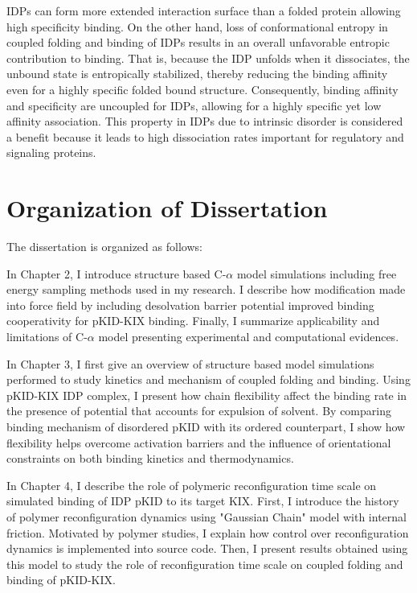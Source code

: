 \documentclass[../talant.diss.submit.tex]{subfiles}
\begin{document}
IDPs can form more extended interaction surface than a folded protein allowing
high specificity binding. On the other hand, loss of conformational entropy in
coupled folding and binding of IDPs results in an overall unfavorable entropic
contribution to binding.
That is, because the IDP unfolds when it dissociates, the unbound state
is entropically stabilized, thereby reducing the binding affinity even for
a highly specific folded bound structure. 
Consequently, binding affinity and specificity are uncoupled for IDPs, allowing for
a highly specific yet low affinity association.
\cite{tompa:02i,zhou:12,dyson:05} This property in IDPs due to intrinsic disorder
is considered a benefit\cite{dunker:01int,dunker:02,uversky:02} because it leads to
high dissociation rates important for regulatory and signaling proteins\cite{zhou:12}.


%
\section{\textbf{Organization of Dissertation}}\label{sect:one_eleven}
%
%
\noindent The dissertation is organized as follows:

In Chapter 2, I introduce structure based C-$\alpha$ model simulations
including free energy sampling methods used in my research.
I describe how modification made into force field by including desolvation
barrier potential improved binding cooperativity for pKID-KIX binding. 
Finally, I summarize applicability and limitations of C-$\alpha$ model
presenting experimental and computational evidences.


In Chapter 3, I first give an overview of structure based model simulations
performed to study kinetics and mechanism of coupled folding and binding.
Using pKID-KIX IDP complex, I present how chain flexibility affect the binding
rate in the presence of potential that accounts for expulsion of solvent.
By comparing binding mechanism of disordered pKID with its ordered counterpart,
I show
how flexibility helps overcome activation barriers and
the influence of orientational constraints on both binding kinetics and
thermodynamics. 

In Chapter 4,
I describe the role of polymeric reconfiguration time scale on simulated binding of
IDP pKID to its target KIX. First, I introduce the history of polymer reconfiguration
dynamics using "Gaussian Chain" model with internal friction. Motivated by polymer studies,
I explain how control over reconfiguration dynamics is implemented into source code. Then,
I present results obtained using this model to study the role of reconfiguration time scale
on coupled folding and binding of pKID-KIX.  
\end{document}
